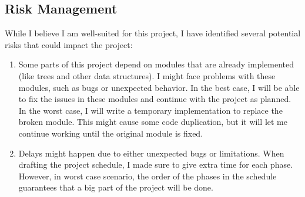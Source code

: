 




\subsection{Risk Management}
While I believe I am well-suited for this project, I have identified several
potential risks that could impact the project:

\begin{enumerate}
  \item Some parts of this project depend on modules that are already implemented (like
        trees and other data structures). I might face problems with these modules,
        such as bugs or unexpected behavior. In the best case, I will be able to fix
        the issues in these modules and continue with the project as planned. In the
        worst case, I will write a temporary implementation to replace the broken
        module. This might cause some code duplication, but it will let me continue
        working until the original module is fixed.

  \item Delays might happen due to either unexpected bugs or limitations. When drafting
        the project schedule, I made sure to give extra time for each phase. However,
        in worst case scenario, the order of the phases in the schedule guarantees that
        a big part of the project will be done.

\end{enumerate}